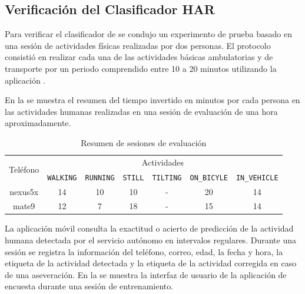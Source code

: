 \subsection{Verificación del Clasificador HAR}

\label{ssec6:verificacion}Para verificar el clasificador 
de \emph{ }se condujo un experimento de prueba basado
en una sesión de actividades físicas realizadas por dos personas.
El protocolo consistió en realizar cada una de las actividades básicas
ambulatorias y de transporte por un periodo comprendido entre 10 a
20 minutos utilizando la aplicación \emph{}. 

En la  se muestra el resumen del tiempo invertido
en minutos por cada persona en las actividades humanas realizadas
en una sesión de evaluación de una hora aproximadamente.

\begin{table}[th]
\begin{centering}
\begin{tabular}{|c|c|c|c|c|c|c|}
\hline 
\multirow{2}{*}{Teléfono} & \multicolumn{6}{c|}{Actividades}\tabularnewline
\cline{2-7} 
 & \texttt{\footnotesize{}WALKING} & \texttt{\footnotesize{}RUNNING} & \texttt{\footnotesize{}STILL} & \texttt{\footnotesize{}TILTING} & \texttt{\footnotesize{}ON\_BICYLE} & \texttt{\footnotesize{}IN\_VEHICLE}\tabularnewline
\hline 
\hline 
nexus5x & 14 & 10 & 10 & - & 20 & 14\tabularnewline
\hline 
mate9 & 12 & 7 & 18 & - & 15 & 14\tabularnewline
\hline 
\end{tabular}
\par\end{centering}
\caption{\label{tab6:vsesiones}Resumen de sesiones de evaluación}
\end{table}

La aplicación móvil \emph{} consulta la exactitud
o acierto de predicción de la actividad humana detectada por el servicio
autónomo \emph{} en intervalos regulares. Durante
una sesión se registra la información del teléfono, correo, edad,
la fecha y hora, la etiqueta de la actividad detectada y la etiqueta
de la actividad corregida en caso de una aseveración. En la 
se muestra la interfaz de usuario de la aplicación de encuesta durante
una sesión de entrenamiento.

